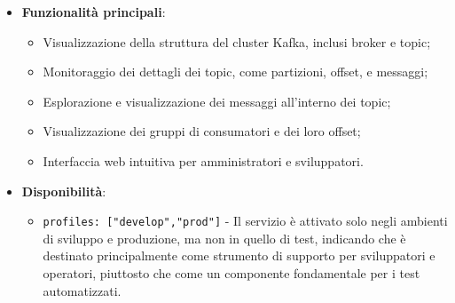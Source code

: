 \documentclass[10pt]{article}
\begin{document}
\begin{itemize}
        \item \textbf{Funzionalità principali}:
        \begin{itemize}
            \item Visualizzazione della struttura del cluster Kafka, inclusi broker e topic;
            \item Monitoraggio dei dettagli dei topic, come partizioni, offset, e messaggi;
            \item Esplorazione e visualizzazione dei messaggi all'interno dei topic;
            \item Visualizzazione dei gruppi di consumatori e dei loro offset;
            \item Interfaccia web intuitiva per amministratori e sviluppatori.
        \end{itemize}
        
        \item \textbf{Disponibilità}:
        \begin{itemize}
            \item \texttt{profiles: ["develop","prod"]} - Il servizio è attivato solo negli ambienti di sviluppo e produzione, ma non in quello di test, indicando che è destinato principalmente come strumento di supporto per sviluppatori e operatori, piuttosto che come un componente fondamentale per i test automatizzati.
        \end{itemize}
        \end{itemize}
\end{document}
